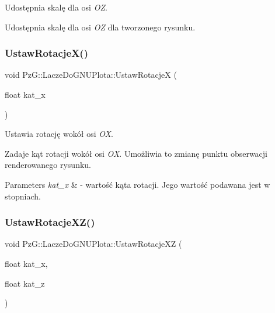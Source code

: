Udostępnia skalę dla osi {\itshape OZ}. 

Udostępnia skalę dla osi {\itshape OZ} dla tworzonego rysunku. \mbox{\label{classPzG_1_1LaczeDoGNUPlota_a88324c53a70846fb6bc9d918ce21fd56}} 
\subsubsection{\texorpdfstring{Ustaw\+Rotacje\+X()}{UstawRotacjeX()}}
{\footnotesize\ttfamily void Pz\+G\+::\+Lacze\+Do\+G\+N\+U\+Plota\+::\+Ustaw\+RotacjeX (\begin{DoxyParamCaption}\item[{float}]{kat\+\_\+x }\end{DoxyParamCaption})\hspace{0.3cm}{\ttfamily [inline]}}



Ustawia rotację wokół osi {\itshape OX}. 

Zadaje kąt rotacji wokół osi {\itshape OX}. Umożliwia to zmianę punktu obserwacji renderowanego rysunku. 
\begin{DoxyParams}{Parameters}
{\em kat\+\_\+x} & -\/ wartość kąta rotacji. Jego wartość podawana jest w stopniach. \\
\hline
\end{DoxyParams}
\mbox{\label{classPzG_1_1LaczeDoGNUPlota_a94d8527fd78048ed6cb32ffb29e5f903}} 
\subsubsection{\texorpdfstring{Ustaw\+Rotacje\+X\+Z()}{UstawRotacjeXZ()}}
{\footnotesize\ttfamily void Pz\+G\+::\+Lacze\+Do\+G\+N\+U\+Plota\+::\+Ustaw\+Rotacje\+XZ (\begin{DoxyParamCaption}\item[{float}]{kat\+\_\+x,  }\item[{float}]{kat\+\_\+z }\end{DoxyParamCaption})\hspace{0.3cm}{\ttfamily [inline]}}



